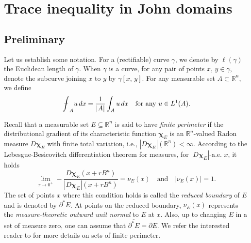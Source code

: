 \documentclass[reqno,11pt]{amsart}
\def\ez{\epsilon}
\def\bint{{\ifinner\rlap{\bf\kern.35em--}
\int\else\rlap{\bf\kern.45em--}\int\fi}\ignorespaces}
\newcommand{\R}{\mathbb{R}}
\numberwithin{equation}{section}
\theoremstyle{remark}
\def\bint{{\ifinner\rlap{\bf\kern.35em--}
\int\else\rlap{\bf\kern.45em--}\int\fi}\ignorespaces}
\begin{document}
\section{Trace inequality in John domains}\label{sec:selection}

\subsection{Preliminary}\label{sec:minimizer john}




Let us establish some notation.
For a (rectifiable) curve $\gamma$, we denote by $\ell(\gamma)$ the Euclidean length of $\gamma$. When $\gamma$ is a curve, for any pair of points $x,\,y\in \gamma$, denote the subcurve joining $x$ to $y$ by $\gamma[x,\,y]$. For any measurable set $A\subset \mathbb R^n$, we define 
$$\bint_A u\,dx=\frac{1}{|A|}\int_A u\, dx\quad \text{for any }u\in L^1(A).$$

Recall that a measurable set $E\subseteq \R^n$  is said to have \emph{finite perimeter} if the distributional gradient of its characteristic function $\mathbf{\chi}_E$ is an $\mathbb R^n$-valued Radon measure $D\mathbf{\chi}_E$ with finite total variation, i.e., $|D\mathbf{\chi}_E|(\R^n)<\infty$.
According to the Lebesgue-Besicovitch differentiation theorem for measures, for $|D\mathbf{\chi}_E|$-a.e. $x$, it holds
\begin{equation}\label{cond}
\lim_{r\to 0^+} - \frac{D\mathbf{\chi}_E(x+rB^n)}{|D\mathbf{\chi}_E|(x+rB^n)} = \nu_E(x) \quad \text{and} \quad |\nu_E(x)| = 1.
\end{equation}
The set of points $x$ where this condition holds is called the \emph{reduced boundary} of $E$ and is denoted by $\partial^*E $.
 At points on the reduced boundary, $\nu_E(x)$ represents the \emph{measure-theoretic outward unit normal} to $E$ at $x$.
Also, up to changing $E$ in a set of measure zero, one can assume that $\overline{\partial^* E}=\partial E$.
We refer the interested reader to  \cite[Sections 12 and 15]{M2012} for more details on sets of finite perimeter.

\end{document}
